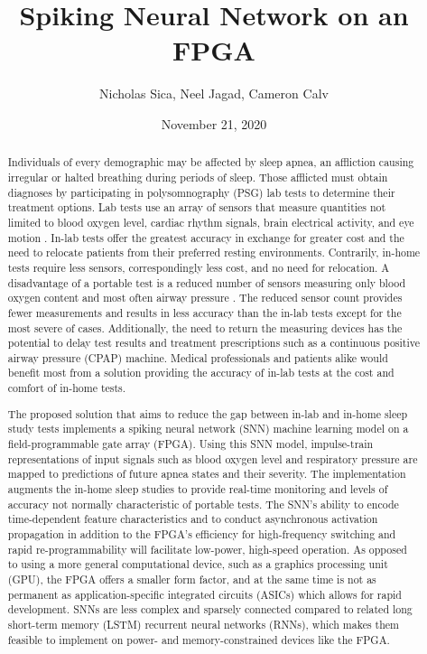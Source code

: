 \documentclass[12pt,titlepage]{article}
\title{Spiking Neural Network on an FPGA}
\author{Nicholas Sica, Neel Jagad, Cameron Calv}
\date{November 21, 2020}
\begin{document}
\maketitle
\newpage
\clearpage
{}

\begin{abstract}
Individuals of every demographic may be affected by sleep apnea, an affliction causing irregular or halted breathing during periods of sleep. 
Those afflicted must obtain diagnoses by participating in polysomnography (PSG) lab tests to determine their treatment options. 
Lab tests use an array of sensors that measure quantities not limited to blood oxygen level, cardiac rhythm signals, brain electrical activity,
and eye motion \cite{elsevier}. In-lab tests offer the greatest accuracy in exchange for greater cost and the need to relocate patients from
their preferred resting environments.
Contrarily, in-home tests require less sensors, correspondingly less cost, and no need for relocation.
A disadvantage of a portable test is a reduced number of sensors measuring only blood oxygen content and most often airway pressure \cite{elsevier}.
The reduced sensor count provides fewer measurements and results in less accuracy than the in-lab tests except for the most severe of cases.
Additionally, the need to return the measuring devices has the potential to delay test results and treatment prescriptions such as a continuous
positive airway pressure (CPAP) machine.
Medical professionals and patients alike would benefit most from a solution providing the accuracy of in-lab tests at the cost and comfort of
in-home tests. 

The proposed solution that aims to reduce the gap between in-lab and in-home sleep study tests implements a spiking neural network (SNN)
machine learning model on a field-programmable gate array (FPGA). Using this SNN model, impulse-train representations of input signals
such as blood oxygen level and respiratory pressure are mapped to predictions of future apnea states and their severity.
The implementation augments the in-home sleep studies to provide real-time monitoring and levels of accuracy not normally characteristic of
portable tests. The SNN’s ability to encode time-dependent feature characteristics and to conduct asynchronous activation propagation
in addition to the FPGA’s efficiency for high-frequency switching and rapid re-programmability will facilitate low-power, high-speed operation.
As opposed to using a more general computational device, such as a graphics processing unit (GPU), the FPGA offers a smaller form factor, and
at the same time is not as permanent as application-specific integrated circuits (ASICs) which allows for rapid development. SNNs are less complex
and sparsely connected compared to related long short-term memory (LSTM) recurrent neural networks (RNNs), which makes them feasible to implement
on power- and memory-constrained devices like the FPGA. 


\end{abstract}
\end{document}
